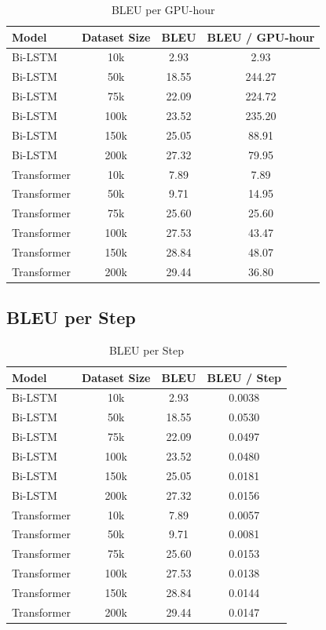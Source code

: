 \documentclass{article}
\begin{document}
\begin{table}[H]
\centering
\caption{BLEU per GPU-hour}
\label{table:bleu-gpu-hour}
\begin{tabular}{|l|c|c|c|}
\hline
\textbf{Model} & \textbf{Dataset Size} & \textbf{BLEU} & \textbf{BLEU / GPU-hour} \\
\hline
Bi-LSTM & 10k & 2.93 & 2.93 \\
Bi-LSTM & 50k & 18.55 & 244.27 \\
Bi-LSTM & 75k & 22.09 & 224.72 \\
Bi-LSTM & 100k & 23.52 & 235.20 \\
Bi-LSTM & 150k & 25.05 & 88.91 \\
Bi-LSTM & 200k & 27.32 & 79.95 \\
\hline
Transformer & 10k & 7.89 & 7.89 \\
Transformer & 50k & 9.71 & 14.95 \\
Transformer & 75k & 25.60 & 25.60 \\
Transformer & 100k & 27.53 & 43.47 \\
Transformer & 150k & 28.84 & 48.07 \\
Transformer & 200k & 29.44 & 36.80 \\
\hline
\end{tabular}
\end{table}

\subsection{BLEU per Step}

\begin{table}[H]
\centering
\caption{BLEU per Step}
\label{table:bleu-gpu-step}
\begin{tabular}{|l|c|c|c|}
\hline
\textbf{Model} & \textbf{Dataset Size} & \textbf{BLEU} & \textbf{BLEU / Step} \protect\footnotemark \\
\hline
Bi-LSTM & 10k & 2.93 & 0.0038 \\
Bi-LSTM & 50k & 18.55 & 0.0530 \\
Bi-LSTM & 75k & 22.09 & 0.0497 \\
Bi-LSTM & 100k & 23.52 & 0.0480 \\
Bi-LSTM & 150k & 25.05 & 0.0181 \\
Bi-LSTM & 200k & 27.32 & 0.0156 \\
\hline
Transformer & 10k & 7.89 & 0.0057 \\
Transformer & 50k & 9.71 & 0.0081 \\
Transformer & 75k & 25.60 & 0.0153 \\
Transformer & 100k & 27.53 & 0.0138 \\
Transformer & 150k & 28.84 & 0.0144 \\
Transformer & 200k & 29.44 & 0.0147 \\
\hline
\end{tabular}
\end{table}
\end{document}
